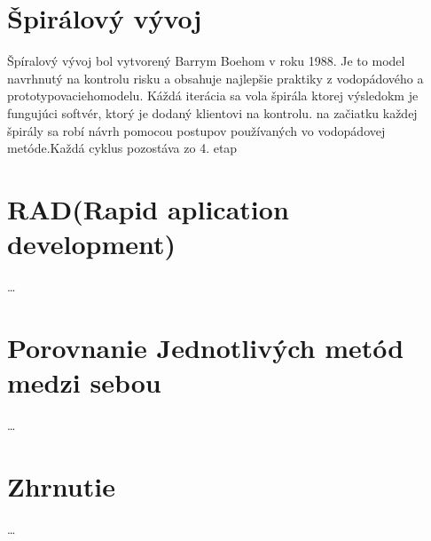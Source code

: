 \documentclass[10pt,oneside,slovak,a4paper]{article}
\begin{document}
\section{Špirálový vývoj}\label{spiral}
Špíralový vývoj bol vytvorený Barrym Boehom v roku 1988. Je to model navrhnutý na kontrolu risku a obsahuje najlepšie praktiky z vodopádového a prototypovaciehomodelu. Káždá iterácia sa vola špirála ktorej výsledokm je fungujúci softvér, ktorý je dodaný klientovi na kontrolu. na začiatku každej špirály sa robí návrh pomocou postupov používaných vo vodopádovej metóde.Každá cyklus pozostáva zo 4. etap\cite{}\\







\section{ RAD(Rapid aplication development)}\label{RAD}
\ldots
\section{Porovnanie Jednotlivých metód medzi sebou}\label{porovnávanie}
\ldots
\section{Zhrnutie}\label{zaver}
\ldots


\end{document}
